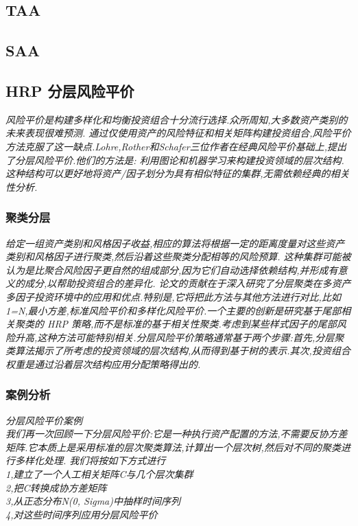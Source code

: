 \documentclass{scrartcl}
\numberwithin{equation}{section}
\begin{document}
\subsection{TAA}

\subsection{SAA}

\subsection{HRP 分层风险平价}
\textsl{
    风险平价是构建多样化和均衡投资组合十分流行选择.众所周知,大多数资产类别的未来表现很难预测. 通过仅使用资产的风险特征和相关矩阵构建投资组合,风险平价方法克服了这一缺点.Lohre,Rother和Schafer三位作者在经典风险平价基础上,提出了分层风险平价.他们的方法是:
    利用图论和机器学习来构建投资领域的层次结构.这种结构可以更好地将资产/因子划分为具有相似特征的集群,无需依赖经典的相关性分析.}
\subsubsection{聚类分层}
\textsl{
    给定一组资产类别和风格因子收益,相应的算法将根据一定的距离度量对这些资产类别和风格因子进行聚类,然后沿着这些聚类分配相等的风险预算.  这种集群可能被认为是比聚合风险因子更自然的组成部分,因为它们自动选择依赖结构,并形成有意义的成分,以帮助投资组合的差异化.
    论文的贡献在于深入研究了分层聚类在多资产多因子投资环境中的应用和优点.特别是,它将把此方法与其他方法进行对比,比如1=N,最小方差,标准风险平价和多样化风险平价.一个主要的创新是研究基于尾部相关聚类的 HRP 策略,而不是标准的基于相关性聚类.考虑到某些样式因子的尾部风险升高,这种方法可能特别相关.分层风险平价策略通常基于两个步骤:首先,分层聚类算法揭示了所考虑的投资领域的层次结构,从而得到基于树的表示.其次,投资组合权重是通过沿着层次结构应用分配策略得出的.}

\subsubsection{案例分析}
\textsl{
    分层风险平价案例\\
    我们再一次回顾一下分层风险平价:它是一种执行资产配置的方法,不需要反协方差矩阵.它本质上是采用标准的层次聚类算法,计算出一个层次树,然后对不同的聚类进行多样化处理.
    我们将按如下方式进行
    \\ 1,建立了一个人工相关矩阵C与几个层次集群
    \\ 2,把C转换成协方差矩阵
    \\ 3,从正态分布N(0, Sigma)中抽样时间序列
    \\ 4,对这些时间序列应用分层风险平价}
\end{document}
